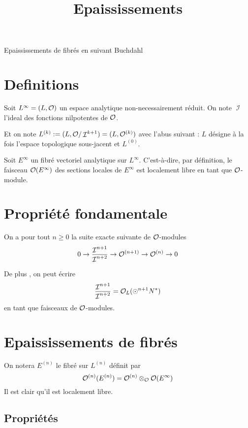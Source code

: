 \documentclass[a4paper]{amsart}
\title{Epaississements}
\author{}
\date{}
\DeclareMathOperator\Ii{\mathcal{I}}
\begin{document}
\maketitle

\setcounter{tocdepth}{3}
\tableofcontents
\vspace*{1cm}

Epaississements de fibrés en suivant Buchdahl \cite{Buchdahl}
\section{Definitions}
\label{sec-1}

Soit $L^\infty = (L,\mathcal{O})$ un espace analytique non-necessairement réduit.
On note $\Ii$ l'ideal des fonctions nilpotentes de $\mathcal{O}$.

Et on note $L^{(k)} := (L, \Oo/\Ii^{k+1}) = (L,\Oo^{(k)})$ avec l'abus suivant :
 $L$ désigne à la fois l'espace topologique sous-jacent et $L^{(0)}$.

Soit $E^\infty$ un fibré vectoriel analytique sur $L^\infty$. C'est-à-dire, par définition, le faisceau $\mathcal{O}(E^\infty)$ des sections locales de $E^\infty$ est localement libre en tant que $\mathcal{O}$-module.
\section{Propriété fondamentale}
\label{sec-2}

On a pour tout $n \geq 0$ la suite exacte suivante de $\mathcal{O}$-modules
\begin{equation}\label{epaississementiteratif}
0 \to \dfrac{\Ii^{n+1}}{\Ii^{n+2}} \to \Oo^{(n+1)} \to \Oo^{(n)} \to 0
\end{equation}

De plus \cite{LeBrun}, on peut écrire
\begin{equation}\label{symmetricconormal}
\dfrac{\Ii^{n+1}}{\Ii^{n+2}} = \Oo_L(\odot^{n+1}N^*)
\end{equation}
en tant que faisceaux de $\mathcal{O}$-modules.
\section{Epaississements de fibrés}
\label{sec-3}

On notera $E^{(n)}$ le fibré sur $L^{(n)}$ définit par
\[
\mathcal{O}^{(n)}(E^{(n)}) = \mathcal{O}^{(n)} \otimes_{\mathcal{O}} \mathcal{O}(E^\infty)
\]
Il est clair qu'il est localement libre.
\subsection{Propriétés}
\label{sec-3-1}
\end{document}
